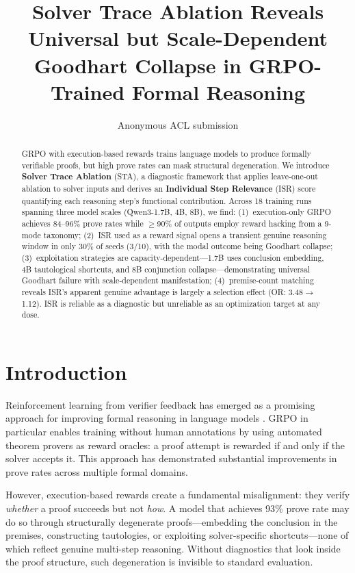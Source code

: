 \documentclass[11pt]{article}
\title{Solver Trace Ablation Reveals Universal but Scale-Dependent\\Goodhart Collapse in GRPO-Trained Formal Reasoning}
\author{Anonymous ACL submission}
\begin{document}
\maketitle

\begin{abstract}
GRPO with execution-based rewards trains language models to produce formally verifiable proofs, but high prove rates can mask structural degeneration. We introduce \textbf{Solver Trace Ablation} (STA), a diagnostic framework that applies leave-one-out ablation to solver inputs and derives an \textbf{Individual Step Relevance} (ISR) score quantifying each reasoning step's functional contribution. Across 18 training runs spanning three model scales (Qwen3-1.7B, 4B, 8B), we find: (1)~execution-only GRPO achieves 84--96\% prove rates while $\geq$90\% of outputs employ reward hacking from a 9-mode taxonomy; (2)~ISR used as a reward signal opens a transient genuine reasoning window in only 30\% of seeds (3/10), with the modal outcome being Goodhart collapse; (3)~exploitation strategies are capacity-dependent---1.7B uses conclusion embedding, 4B tautological shortcuts, and 8B conjunction collapse---demonstrating universal Goodhart failure with scale-dependent manifestation; (4)~premise-count matching reveals ISR's apparent genuine advantage is largely a selection effect (OR: 3.48$\to$1.12). ISR is reliable as a diagnostic but unreliable as an optimization target at any dose.
\end{abstract}

\section{Introduction}

Reinforcement learning from verifier feedback has emerged as a promising approach for improving formal reasoning in language models \cite{deepseek-r1,shao2024deepseekmath}. GRPO \cite{shao2024deepseekmath} in particular enables training without human annotations by using automated theorem provers as reward oracles: a proof attempt is rewarded if and only if the solver accepts it. This approach has demonstrated substantial improvements in prove rates across multiple formal domains.

However, execution-based rewards create a fundamental misalignment: they verify \emph{whether} a proof succeeds but not \emph{how}. A model that achieves 93\% prove rate may do so through structurally degenerate proofs---embedding the conclusion in the premises, constructing tautologies, or exploiting solver-specific shortcuts---none of which reflect genuine multi-step reasoning. Without diagnostics that look inside the proof structure, such degeneration is invisible to standard evaluation.
\end{document}
